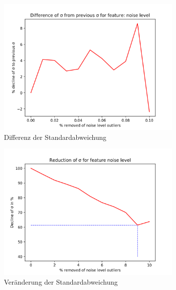 \begin{figure}[h]
\begin{subfigure}{.5\textwidth}
  \includegraphics[width=\linewidth]{images/anhang/outlier_detection/noise_level_diff_of_std.png}
  \caption{Differenz der Standardabweichung}
\end{subfigure}
\begin{subfigure}{.5\textwidth}
  \centering
  \includegraphics[width=\linewidth]{images/anhang/outlier_detection/noise_level_std.png}
  \caption{Veränderung der Standardabweichung}
\end{subfigure}
\begin{subfigure}{.5\textwidth}
  \centering

\end{subfigure}
\end{figure}
